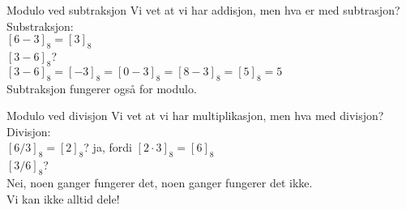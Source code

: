 \begin{frame}[fragile]{Modulo ved subtraksjon}
       Vi vet at vi har addisjon, men hva er med subtrasjon?\\

Substraksjon:\\
$[6-3]_8=[3]_8$\\
$[3-6]_8$?\\
\pause
$[3-6]_8=[-3]_8=[0-3]_8=[8-3]_8=[5]_8=5$\\

Subtraksjon fungerer også for modulo.  
\end{frame}

\begin{frame}{Modulo ved divisjon}
Vi vet at vi har multiplikasjon, men hva med divisjon?\\

Divisjon:\\
$[6/3]_8=[2]_8$? \pause ja, fordi $[2\cdot 3]_8=[6]_8$\\
$[3/6]_8$?\\
\pause
Nei, noen ganger fungerer det, noen ganger fungerer det ikke.\\

Vi kan ikke alltid dele!
\end{frame}